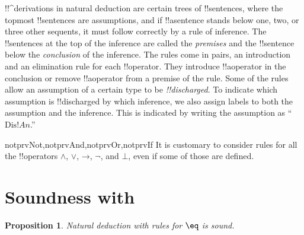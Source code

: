 \documentclass[10pt,a4paper]{article}
\theoremstyle{plain}
\newtheorem{prop}[thm]{Proposition}
\theoremstyle{definition}
\theoremstyle{remark}
\newcommand*{\olfileid}[3]{}
\newcommand*{\olsection}[1]{\section*{#1}}
\providecommand{\lif}{\mathbin{\rightarrow}}
\providecommand{\lfalse}{\bot}
\providecommand{\iftag}[1]{#1}
\providecommand{\Discharge}{\mathrm{Dis}}
\begin{document}
!!^{derivation}s in natural deduction are certain trees of
!!{sentence}s, where the topmost !!{sentence}s are assumptions, and if
!!a{sentence} stands below one, two, or three other sequents, it must
follow correctly by a rule of inference. The !!{sentence}s at the top
of the inference are called the \emph{premises} and the !!{sentence}
below the \emph{conclusion} of the inference.  The rules come in
pairs, an introduction and an elimination rule for each
!!{operator}. They introduce !!a{operator} in the conclusion or
remove !!a{operator} from a premise of the rule.  Some of the rules
allow an assumption of a certain type to be \emph{!!{discharged}}. To
indicate which assumption is !!{discharged} by which inference, we
also assign labels to both the assumption and the inference.  This is
indicated by writing the assumption as ``$\Discharge{!A}{n}$.''


\iftag{notprvNot,notprvAnd,notprvOr,notprvIf}{}%
	{It is customary to consider rules for all the !!{operator}s $\land$, $\lor$, $\lif$, $\lnot$, and $\lfalse$, even if some of those are defined.}







\olfileid{fol}{ntd}{sid}

\olsection{Soundness with }

\begin{prop}
Natural deduction with rules for $\eq$ is sound.
\end{prop}
\end{document}
